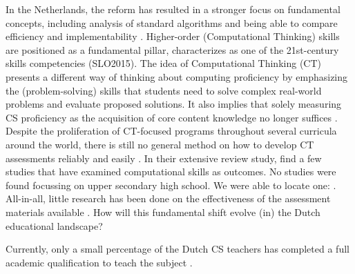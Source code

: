 In the Netherlands, the reform has resulted in a stronger focus on fundamental concepts, including analysis of standard algorithms and being able to compare efficiency and implementability \cite{Barendsen2016}. Higher-order (Computational Thinking) skills are positioned as a fundamental pillar, characterizes as one of the 21st-century skills competencies (SLO2015). The idea of Computational Thinking (CT) presents a different way of thinking about computing proficiency by emphasizing the (problem-solving) skills that students need to solve complex real-world problems and evaluate proposed solutions. It also implies that solely measuring CS proficiency as the acquisition of core content knowledge no longer suffices \cite{Yadav2015}. Despite the proliferation of CT-focused programs throughout several curricula around the world, there is still no general method on how to develop CT assessments reliably and easily \cite{catete2017framework}. In their extensive review study,  find a few studies that have examined computational skills as outcomes. No studies were found focussing on upper secondary high school. We were able to locate one: . All-in-all, little research has been done on the effectiveness of the assessment materials available \cite{Yadav2016}.
How will this fundamental shift evolve (in) the Dutch educational landscape?




Currently, only a small percentage of the Dutch CS teachers has completed a full academic qualification to teach the subject \cite{tolboom2014informatica}.

